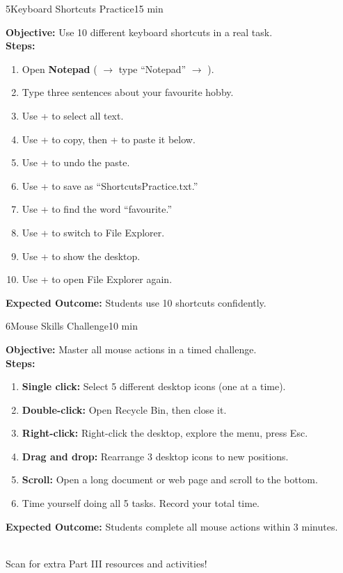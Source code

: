 \begin{labactivity}{5}{Keyboard Shortcuts Practice}{15 min}

\textbf{Objective:} Use 10 different keyboard shortcuts in a real task.\\[4pt]
\textbf{Steps:}
\begin{enumerate}[label=\protect\stepcircle{\arabic*}, leftmargin=2cm, itemsep=4pt]
  \item Open \textbf{Notepad} ( $\rightarrow$ type ``Notepad'' $\rightarrow$ ).
  \item Type three sentences about your favourite hobby.
  \item Use + to select all text.
  \item Use + to copy, then + to paste it below.
  \item Use + to undo the paste.\item Use + to save as ``ShortcutsPractice.txt.''
  \item Use + to find the word ``favourite.''
  \item Use + to switch to File Explorer.
  \item Use + to show the desktop.
  \item Use + to open File Explorer again.
\end{enumerate}
\textbf{Expected Outcome:} Students use 10 shortcuts confidently.
\welldone
\end{labactivity}

\begin{labactivity}{6}{Mouse Skills Challenge}{10 min}

\textbf{Objective:} Master all mouse actions in a timed challenge.\\[4pt]
\textbf{Steps:}
\begin{enumerate}[label=\protect\stepcircle{\arabic*}, leftmargin=2cm, itemsep=4pt]
  \item \textbf{Single click:} Select 5 different desktop icons (one at a time).
  \item \textbf{Double-click:} Open Recycle Bin, then close it.
  \item \textbf{Right-click:} Right-click the desktop, explore the menu, press Esc.
  \item \textbf{Drag and drop:} Rearrange 3 desktop icons to new positions.
  \item \textbf{Scroll:} Open a long document or web page and scroll to the bottom.
  \item Time yourself doing all 5 tasks. Record your total time.
\end{enumerate}
\textbf{Expected Outcome:} Students complete all mouse actions within 3 minutes.
\welldone
\end{labactivity}

\vspace{12pt}
\begin{center}
  \\[6pt]
  {\small\sffamily\textcolor{NavyBlue}{Scan for extra Part III resources and activities!}}
\end{center}
